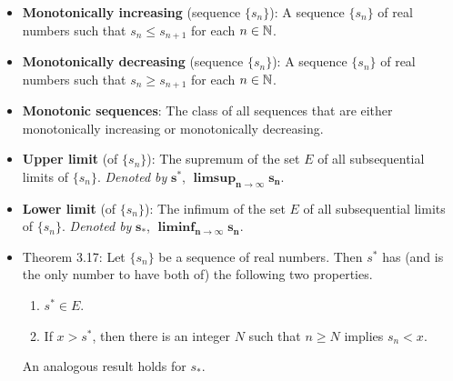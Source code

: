 \documentclass[../../notes.tex]{subfiles}
\begin{document}
\begin{itemize}
\begin{itemize}
    \end{itemize}
    \item \textbf{Monotonically increasing} (sequence $\{s_n\}$): A sequence $\{s_n\}$ of real numbers such that $s_n\leq s_{n+1}$ for each $n\in\mathbb{N}$.
    \item \textbf{Monotonically decreasing} (sequence $\{s_n\}$): A sequence $\{s_n\}$ of real numbers such that $s_n\geq s_{n+1}$ for each $n\in\mathbb{N}$.
    \item \textbf{Monotonic sequences}: The class of all sequences that are either monotonically increasing or monotonically decreasing.
    \item \textbf{Upper limit} (of $\{s_n\}$): The supremum of the set $E$ of all subsequential limits of $\{s_n\}$. \emph{Denoted by} $\bm{s^*}$, $\bm{\limsup_{n\to\infty}s_n}$.
    \item \textbf{Lower limit} (of $\{s_n\}$): The infimum of the set $E$ of all subsequential limits of $\{s_n\}$. \emph{Denoted by} $\bm{s_*}$, $\bm{\liminf_{n\to\infty}s_n}$.
    \item Theorem 3.17: Let $\{s_n\}$ be a sequence of real numbers. Then $s^*$ has (and is the only number to have both of) the following two properties.
    \begin{enumerate}[label={(\alph*)}]
        \item $s^*\in E$.
        \item If $x>s^*$, then there is an integer $N$ such that $n\geq N$ implies $s_n<x$.
    \end{enumerate}
    An analogous result holds for $s_*$.
\end{itemize}
\end{document}
